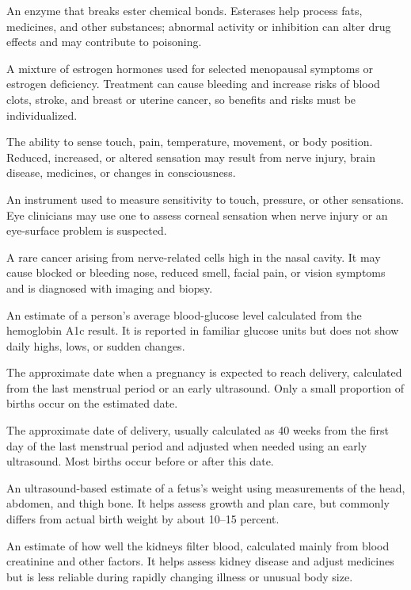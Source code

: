  An enzyme that breaks ester chemical bonds. Esterases help process fats, medicines, and other substances; abnormal activity or inhibition can alter drug effects and may contribute to poisoning.

 A mixture of estrogen hormones used for selected menopausal symptoms or estrogen deficiency. Treatment can cause bleeding and increase risks of blood clots, stroke, and breast or uterine cancer, so benefits and risks must be individualized.

 The ability to sense touch, pain, temperature, movement, or body position. Reduced, increased, or altered sensation may result from nerve injury, brain disease, medicines, or changes in consciousness.

 An instrument used to measure sensitivity to touch, pressure, or other sensations. Eye clinicians may use one to assess corneal sensation when nerve injury or an eye-surface problem is suspected.

 A rare cancer arising from nerve-related cells high in the nasal cavity. It may cause blocked or bleeding nose, reduced smell, facial pain, or vision symptoms and is diagnosed with imaging and biopsy.

 An estimate of a person’s average blood-glucose level calculated from the hemoglobin A1c result. It is reported in familiar glucose units but does not show daily highs, lows, or sudden changes.

 The approximate date when a pregnancy is expected to reach delivery, calculated from the last menstrual period or an early ultrasound. Only a small proportion of births occur on the estimated date.

 The approximate date of delivery, usually calculated as 40 weeks from the first day of the last menstrual period and adjusted when needed using an early ultrasound. Most births occur before or after this date.

 An ultrasound-based estimate of a fetus’s weight using measurements of the head, abdomen, and thigh bone. It helps assess growth and plan care, but commonly differs from actual birth weight by about 10–15 percent.

 An estimate of how well the kidneys filter blood, calculated mainly from blood creatinine and other factors. It helps assess kidney disease and adjust medicines but is less reliable during rapidly changing illness or unusual body size.

